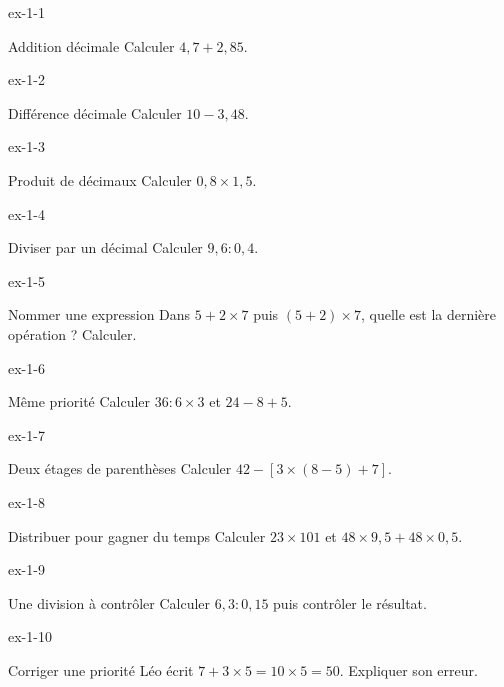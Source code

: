 \clearpage{}
\begin{blocLivre}{ex-1-1}\begin{exercice}[1]{Addition décimale}
Calculer $4{,}7+2{,}85$.
\end{exercice}\end{blocLivre}
\begin{blocLivre}{ex-1-2}\begin{exercice}[1]{Différence décimale}
Calculer $10-3{,}48$.
\end{exercice}\end{blocLivre}
\begin{blocLivre}{ex-1-3}\begin{exercice}[1]{Produit de décimaux}
Calculer $0{,}8\times1{,}5$.
\end{exercice}\end{blocLivre}
\begin{blocLivre}{ex-1-4}\begin{exercice}[1]{Diviser par un décimal}
Calculer $9{,}6:0{,}4$.
\end{exercice}\end{blocLivre}
\begin{blocLivre}{ex-1-5}\begin{exercice}[1]{Nommer une expression}
Dans $5+2\times7$ puis $(5+2)\times7$, quelle est la dernière opération ? Calculer.
\end{exercice}\end{blocLivre}

\begin{blocLivre}{ex-1-6}\begin{exercice}[2]{Même priorité}
Calculer $36:6\times3$ et $24-8+5$.
\end{exercice}\end{blocLivre}
\begin{blocLivre}{ex-1-7}\begin{exercice}[2]{Deux étages de parenthèses}
Calculer $42-[3\times(8-5)+7]$.
\end{exercice}\end{blocLivre}
\begin{blocLivre}{ex-1-8}\begin{exercice}[2]{Distribuer pour gagner du temps}
Calculer $23\times101$ et $48\times9{,}5+48\times0{,}5$.
\end{exercice}\end{blocLivre}
\begin{blocLivre}{ex-1-9}\begin{exercice}[2]{Une division à contrôler}
Calculer $6{,}3:0{,}15$ puis contrôler le résultat.
\end{exercice}\end{blocLivre}
\begin{blocLivre}{ex-1-10}\begin{exercice}[2]{Corriger une priorité}
Léo écrit $7+3\times5=10\times5=50$. Expliquer son erreur.
\end{exercice}\end{blocLivre}

